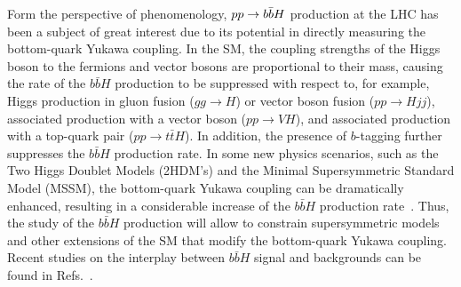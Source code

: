 \documentclass[main.tex]{subfiles}
\begin{document}
%

Form the perspective of phenomenology, $pp \rightarrow b\bar{b}H$ production at the LHC has been a subject of great interest due to its
potential in directly measuring the bottom-quark Yukawa coupling. In the SM, the
coupling strengths of the Higgs boson to the fermions and vector bosons are proportional to their
mass, causing the rate of the $b\bar{b}H$ production to be suppressed with respect to, for example,
Higgs production in gluon fusion ($gg\to H$) or vector boson fusion ($pp\to Hjj$), associated
production with a vector boson ($pp\to VH$), and associated production with a top-quark pair ($pp\to
t\bar{t}H$). In addition, the presence of $b$-tagging further suppresses the $b\bar{b}H$ production
rate.  In some new physics scenarios, such as the Two Higgs Doublet Models (2HDM's) and the Minimal
Supersymmetric Standard Model (MSSM), the bottom-quark Yukawa coupling can be dramatically enhanced,
resulting in a considerable increase of the $b\bar{b}H$ production
rate~\cite{Balazs:1998nt,Dawson:2005vi}.  Thus, the study of the $b\bar{b}H$ production will allow
to constrain supersymmetric models and other extensions of the SM that modify the bottom-quark
Yukawa coupling. Recent studies on the interplay between $b\bar{b}H$ signal and backgrounds can be
found in Refs.~\cite{Pagani:2020rsg,Grojean:2020ech,Konar:2021nkk}.
\end{document}
